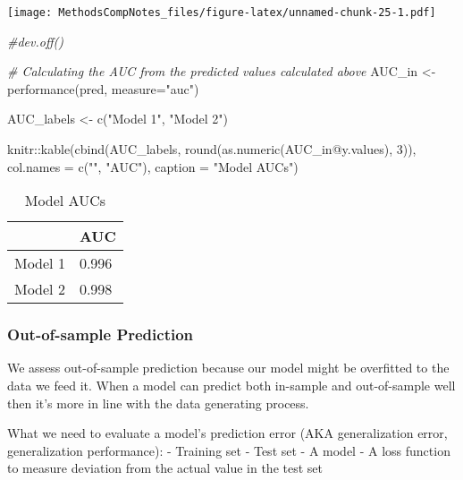 \documentclass[
]{article}
\newenvironment{Shaded}{\begin{snugshade}}{\end{snugshade}}
\newcommand{\AttributeTok}[1]{\textcolor[rgb]{0.77,0.63,0.00}{#1}}
\newcommand{\CommentTok}[1]{\textcolor[rgb]{0.56,0.35,0.01}{\textit{#1}}}
\newcommand{\DecValTok}[1]{\textcolor[rgb]{0.00,0.00,0.81}{#1}}
\newcommand{\FunctionTok}[1]{\textcolor[rgb]{0.00,0.00,0.00}{#1}}
\newcommand{\NormalTok}[1]{#1}
\newcommand{\OtherTok}[1]{\textcolor[rgb]{0.56,0.35,0.01}{#1}}
\newcommand{\SpecialCharTok}[1]{\textcolor[rgb]{0.00,0.00,0.00}{#1}}
\newcommand{\StringTok}[1]{\textcolor[rgb]{0.31,0.60,0.02}{#1}}
\begin{document}
\texttt{[image: MethodsCompNotes\_files/figure-latex/unnamed-chunk-25-1.pdf]}

\begin{Shaded}
\begin{Highlighting}[]
\CommentTok{\#dev.off()}

\CommentTok{\# Calculating the AUC from the predicted values calculated above}
\NormalTok{AUC\_in }\OtherTok{\textless{}{-}} \FunctionTok{performance}\NormalTok{(pred, }\AttributeTok{measure=}\StringTok{"auc"}\NormalTok{)}

\NormalTok{AUC\_labels }\OtherTok{\textless{}{-}} \FunctionTok{c}\NormalTok{(}\StringTok{"Model 1"}\NormalTok{, }\StringTok{"Model 2"}\NormalTok{)}

\NormalTok{knitr}\SpecialCharTok{::}\FunctionTok{kable}\NormalTok{(}\FunctionTok{cbind}\NormalTok{(AUC\_labels, }\FunctionTok{round}\NormalTok{(}\FunctionTok{as.numeric}\NormalTok{(AUC\_in}\SpecialCharTok{@}\NormalTok{y.values), }\DecValTok{3}\NormalTok{)), }\AttributeTok{col.names =} \FunctionTok{c}\NormalTok{(}\StringTok{""}\NormalTok{, }\StringTok{"AUC"}\NormalTok{),}
      \AttributeTok{caption =} \StringTok{"Model AUCs"}\NormalTok{)}
\end{Highlighting}
\end{Shaded}

\begin{table}

\caption{\label{tab:unnamed-chunk-25}Model AUCs}
\centering
\begin{tabular}[t]{l|l}
\hline
 & AUC\\
\hline
Model 1 & 0.996\\
\hline
Model 2 & 0.998\\
\hline
\end{tabular}
\end{table}

\hypertarget{out-of-sample-prediction}{%
\subsubsection{Out-of-sample
Prediction}\label{out-of-sample-prediction}}

We assess out-of-sample prediction because our model might be overfitted
to the data we feed it. When a model can predict both in-sample and
out-of-sample well then it's more in line with the data generating
process.

What we need to evaluate a model's prediction error (AKA generalization
error, generalization performance): - Training set - Test set - A model
- A loss function to measure deviation from the actual value in the test
set
\end{document}
